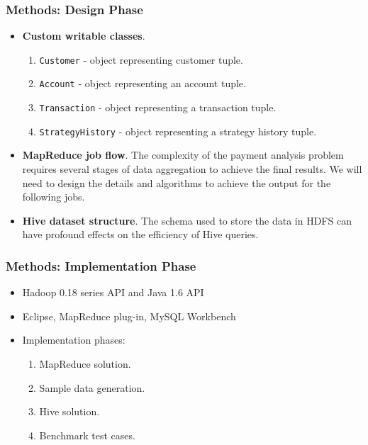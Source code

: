 \documentclass[hyperref={pdfpagelabels=false}]{beamer}
\begin{document}
\begin{frame}
\frametitle{Methods: Design Phase}
\begin{itemize}
 \item \textbf{Custom writable classes}.
      \begin{enumerate}
       \item \texttt{Customer} - object representing customer tuple.
       \item \texttt{Account} - object representing an account tuple.
       \item \texttt{Transaction} - object representing a transaction tuple.
       \item \texttt{StrategyHistory} - object representing a strategy history
        tuple.
      \end{enumerate}
 \pause
 \item \textbf{MapReduce job flow}. The complexity of the payment analysis
      problem requires several stages of data aggregation to achieve the final
      results. We will need to design the details and algorithms to achieve
      the output for the following jobs.
 \pause
 \item \textbf{Hive dataset structure}. The schema used to store the
       data in HDFS can have profound effects on the efficiency of Hive
       queries. 
\end{itemize}


\end{frame}


\begin{frame}
\frametitle{Methods: Implementation Phase}
\begin{itemize}
  \item Hadoop 0.18 series API and Java 1.6 API
  \pause
  \item Eclipse, MapReduce plug-in, MySQL Workbench
  \pause
  \item Implementation phases:
  \pause
    \begin{enumerate}
      \item MapReduce solution.
      \pause
      \item Sample data generation.
      \pause
      \item Hive solution.
      \pause
      \item Benchmark test cases.
      \pause
    \end{enumerate}
\end{itemize}

\end{frame}
\end{document}
